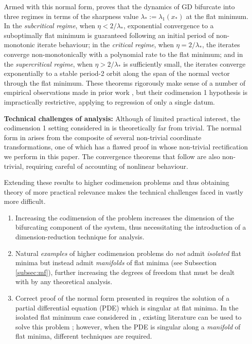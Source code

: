 \documentclass{article}
\theoremstyle{plain}
\theoremstyle{definition}
\theoremstyle{remark}
\begin{document}
Armed with this normal form, \cite{macdonaldeos} proves that the dynamics of GD bifurcate into three regimes in terms of the sharpness value $\lambda_*:=\lambda_1(x_*)$ at the flat minimum. In the \emph{subcritical regime}, when $\eta<2/\lambda_*$, exponential convergence to a suboptimally flat minimum is guaranteed following an initial period of non-monotonic iterate behaviour; in the \emph{critical regime}, when $\eta = 2/\lambda_*$, the iterates converge non-monotonically with a polynomial rate to the flat minimum; and in the \emph{supercritical regime}, when $\eta>2/\lambda_*$ is sufficiently small, the iterates converge exponentially to a stable period-2 orbit along the span of the normal vector through the flat minimum. These theorems rigorously make sense of a number of empirical observations made in prior work \cite{chen2023eos, kalraeos}, but their codimension 1 hypothesis is impractically restrictive, applying to regression of only a single datum.

\textbf{Technical challenges of analysis:} Although of limited practical interest, the codimension 1 setting considered in \cite{macdonaldeos} is theoretically far from trivial. The normal form in \cite{macdonaldeos} arises from the composite of several non-trivial coordinate transformations, one of which has a flawed proof in \cite{macdonaldeos} whose non-trivial rectification we perform in this paper. The convergence theorems that follow are also non-trivial, requiring careful of accounting of nonlinear behaviour.

Extending these results to higher codimension problems and thus obtaining theory of more practical relevance makes the technical challenges faced in \cite{macdonaldeos} vastly more difficult.
\begin{enumerate}[leftmargin=*]
    \item Increasing the codimension of the problem increases the dimension of the bifurcating component of the system, thus necessitating the introduction of a dimension-reduction technique for analysis.
    \item Natural \emph{examples} of higher codimension problems do \emph{not} admit \emph{isolated} flat minima but instead admit \emph{manifolds} of flat minima (see Subsection \ref{subsec:mf}), further increasing the degrees of freedom that must be dealt with by any theoretical analysis.
    \item Correct proof of the normal form presented in \cite{macdonaldeos} requires the solution of a partial differential equation (PDE) which is singular at flat minima. In the isolated flat minimum case considered in \cite{macdonaldeos}, existing literature can be used to solve this problem \cite{singularpde}; however, when the PDE is singular along a \emph{manifold} of flat minima, different techniques are required.
\end{enumerate}
\end{document}
